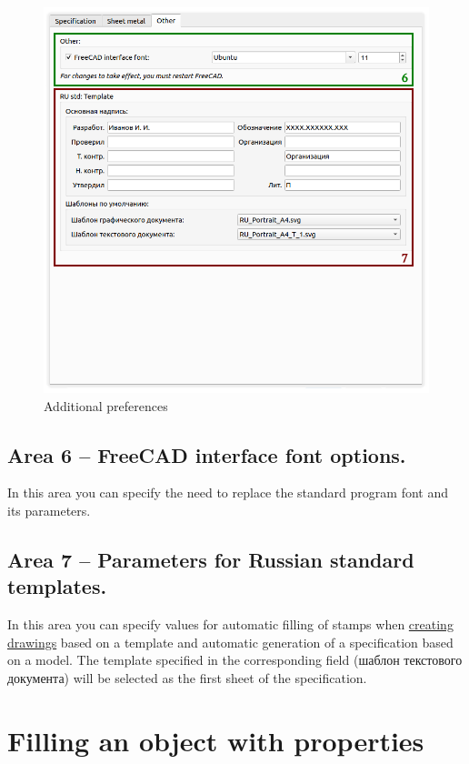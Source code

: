 \documentclass[a4paper,12pt]{article}
\begin{document}
\begin{figure}[htp]
	\centering
	\includegraphics[width=1\textwidth]{img/pref_other.png}
	\caption{Additional preferences}
	\label{sec:pref_other}
\end{figure}

\subsection{Area 6 -- FreeCAD interface font options.}
In this area you can specify the need to replace the standard program font and its parameters.

\subsection{Area 7 -- Parameters for Russian standard templates.}
In this area you can specify values ​​for automatic filling of stamps when \hyperref[sec:8]{creating drawings} based on a template and automatic generation of a specification based on a model. The template specified in the corresponding field (шаблон текстового документа) will be selected as the first sheet of the specification.

\pagebreak




\section{Filling an object with properties}
\end{document}

